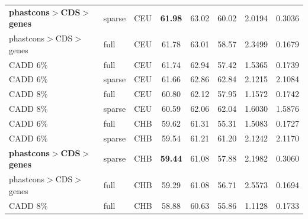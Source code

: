 \documentclass[11pt]{article}
\begin{document}
\begin{table}
\begin{tabular}{lll|crr|cc}
\textbf{phastcons$>$CDS$>$genes} &            sparse &          CEU &                        \textbf{61.98} &             63.02 &            60.02 &                                 2.0194 &                                0.3036 \\
phastcons$>$CDS$>$genes &              full &          CEU &                        61.78 &             63.01 &            58.57 &                                 2.3499 &                                0.1679 \\
               CADD 6\% &              full &          CEU &                        61.74 &             62.94 &            57.42 &                                 1.5365 &                                0.1739 \\
               CADD 6\% &            sparse &          CEU &                        61.66 &             62.86 &            62.84 &                                 2.1215 &                                2.1084 \\
               CADD 8\% &              full &          CEU &                        60.80 &             62.12 &            57.95 &                                 1.1572 &                                0.1742 \\
               CADD 8\% &            sparse &          CEU &                        60.59 &             62.06 &            62.04 &                                 1.6030 &                                1.5876 \\
               CADD 6\% &              full &          CHB &                        59.62 &             61.31 &            55.31 &                                 1.5083 &                                0.1727 \\
               CADD 6\% &            sparse &          CHB &                        59.54 &             61.21 &            61.20 &                                 2.1242 &                                2.1170 \\
               \textbf{phastcons$>$CDS$>$genes} &            sparse &          CHB &                        \textbf{59.44} &             61.08 &            57.88 &                                 2.1982 &                                0.3060 \\
phastcons$>$CDS$>$genes &              full &          CHB &                        59.29 &             61.08 &            56.71 &                                 2.5573 &                                0.1694 \\
               CADD 8\% &              full &          CHB &                        58.88 &             60.63 &            55.86 &                                 1.1128 &                                0.1733 \\

\end{tabular}
\end{table}
\end{document}
